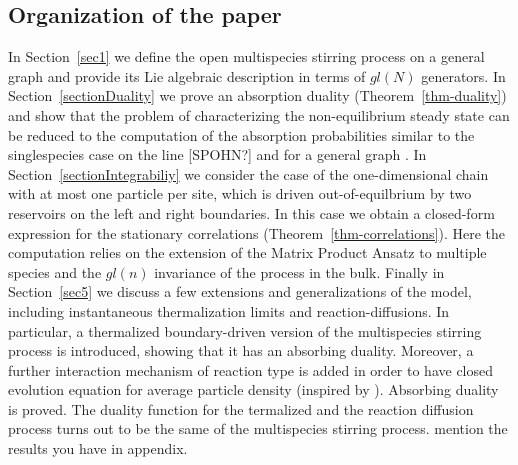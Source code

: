 \documentclass[10pt]{article}
\numberwithin{equation}{section}
\numberwithin{equation}{subsection}
\begin{document}
\subsection*{Organization of the paper}
In Section~\ref{sec1} we define the open multispecies stirring
process on a general graph and provide its Lie algebraic description in terms of $gl(N)$ generators. In Section~\ref{sectionDuality} we prove an absorption duality (Theorem~\ref{thm-duality})
and show that the problem of characterizing the non-equilibrium
steady state can be reduced to the computation of the absorption probabilities similar to the singlespecies case on the line [SPOHN?] and for a general graph \cite{ frassek2020duality}. 
In Section~\ref{sectionIntegrabiliy}  we consider  the case of the one-dimensional chain with at most one 
particle per site, which is driven out-of-equilbrium by two reservoirs on the left and right boundaries. In this case we obtain a closed-form expression for the stationary correlations (Theorem~\ref{thm-correlations}). Here the computation
relies on the extension of the  Matrix Product Ansatz \cite{derrida1993exact} to multiple species \cite{vanicat2017exact} and the $gl(n)$ invariance of the process in the bulk. Finally in Section~\ref{sec5} we discuss a few extensions 
and generalizations of the model, including instantaneous thermalization limits and reaction-diffusions. {\color{blue} In particular, a thermalized boundary-driven version of the multispecies stirring process is introduced, showing that it has an absorbing duality. Moreover, a further interaction mechanism of reaction type is added in order to have closed evolution equation for average particle density (inspired by \cite{casini2022uphill,schutzReaction}). Absorbing duality is proved. The duality function for the termalized and the reaction diffusion process turns out to be the same of the multispecies stirring process.} {\color{red} mention the results you have in appendix}.



\end{document}
